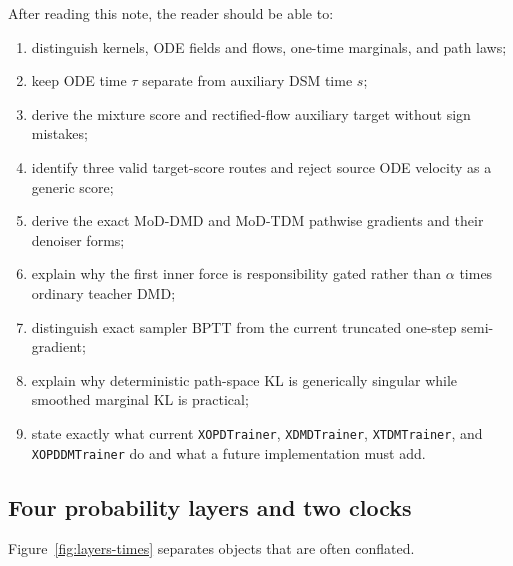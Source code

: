 \documentclass[11pt,a4paper]{article}
\theoremstyle{plain}
\theoremstyle{definition}
\begin{document}
After reading this note, the reader should be able to:
\begin{enumerate}[leftmargin=1.6em]
\item distinguish kernels, ODE fields and flows, one-time marginals, and path laws;
\item keep ODE time $\tau$ separate from auxiliary DSM time $s$;
\item derive the mixture score and rectified-flow auxiliary target without sign mistakes;
\item identify three valid target-score routes and reject source ODE velocity as a generic score;
\item derive the exact MoD-DMD and MoD-TDM pathwise gradients and their denoiser forms;
\item explain why the first inner force is responsibility gated rather than $\alpha$ times
      ordinary teacher DMD;
\item distinguish exact sampler BPTT from the current truncated one-step semi-gradient;
\item explain why deterministic path-space KL is generically singular while smoothed marginal KL
      is practical;
\item state exactly what current \texttt{XOPDTrainer}, \texttt{XDMDTrainer},
      \texttt{XTDMTrainer}, and \texttt{XOPDDMTrainer} do and what a future implementation
      must add.
\end{enumerate}

\subsection{Four probability layers and two clocks}

Figure~\ref{fig:layers-times} separates objects that are often conflated.
\end{document}
